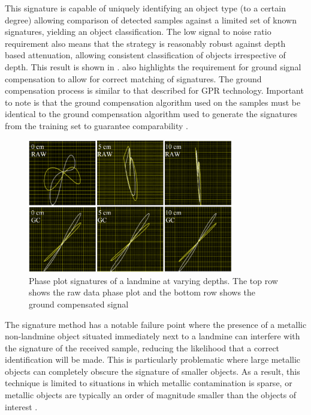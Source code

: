 \documentclass[main.tex]{subfiles}
\begin{document}
This signature is capable of uniquely identifying an object type (to a certain degree) allowing comparison of detected samples against a limited set of known signatures, yielding an object classification. The low signal to noise ratio requirement also means that the strategy is reasonably robust against depth based attenuation, allowing consistent classification of objects irrespective of depth. This result is shown in .  also highlights the requirement for ground signal compensation to allow for correct matching of signatures. The ground compensation process is similar to that described for GPR technology. Important to note is that the ground compensation algorithm used on the samples must be identical to the ground compensation algorithm used to generate the signatures from the training set to guarantee comparability \parencite{Kruger2006}.
\begin{figure}[ht]
\includegraphics[width=0.8\textwidth]{2-LiteratureReview/compensated-signature.png}
\centering
\caption[Phase plot signatures of a landmine at varying depths]{Phase plot signatures of a landmine at varying depths. The top row shows the raw data phase plot and the bottom row shows the ground compensated signal \parencite{Kruger2006}} 
\end{figure}

The signature method has a notable failure point where the presence of a metallic non-landmine object situated immediately next to a landmine can interfere with the signature of the received sample, reducing the likelihood that a correct identification will be made. This is particularly problematic where large metallic objects can completely obscure the signature of smaller objects. As a result, this technique is limited to situations in which metallic contamination is sparse, or metallic objects are typically an order of magnitude smaller than the objects of interest \parencite{Kruger2006}.
\end{document}
